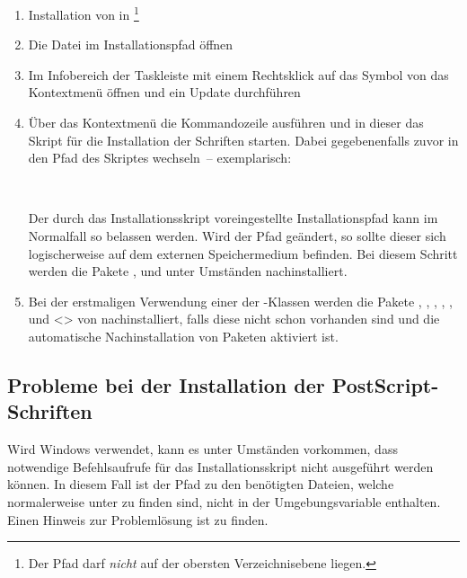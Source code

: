 \begin{enumerate}
\item Installation von  in 
  \footnote{Der Pfad darf \emph{nicht} auf der obersten Verzeichnisebene 
   liegen.
  }
\item Die Datei  im Installationspfad öffnen
\item Im Infobereich der Taskleiste mit einem Rechtsklick auf das Symbol von 
   das Kontextmenü öffnen und ein Update 
  durchführen
\item Über das Kontextmenü die Kommandozeile ausführen und in dieser das Skript 
  für die Installation der Schriften  starten.
  Dabei gegebenenfalls zuvor in den Pfad des Skriptes wechseln~-- exemplarisch:
  \begin{quoting}[leftmargin=1.5em,rightmargin=0pt]
  \newline
  \,
  \end{quoting}
  Der durch das Installationsskript voreingestellte Installationspfad kann im 
  Normalfall so belassen werden. Wird der Pfad geändert, so sollte dieser sich 
  logischerweise auf dem externen Speichermedium 
   befinden. Bei diesem Schritt 
  werden die Pakete ,  und  
  unter Umständen nachinstalliert.
\item Bei der erstmaligen Verwendung einer der \TUDScript-Klassen werden die 
  Pakete , , ,
  , ,  und
  <> von 
  nachinstalliert, falls diese nicht schon vorhanden sind und die automatische 
  Nachinstallation von Paketen aktiviert ist.
\end{enumerate}


\subsection{Probleme bei der Installation der PostScript-Schriften}
%
Wird Windows verwendet, kann es unter Umständen vorkommen, dass notwendige 
Befehlsaufrufe für das Installationsskript nicht ausgeführt werden können. In 
diesem Fall ist der Pfad zu den benötigten Dateien, welche normalerweise unter 
 zu finden sind, nicht in der 
Umgebungsvariable  enthalten. Einen Hinweis zur Problemlösung ist 
zu finden.

